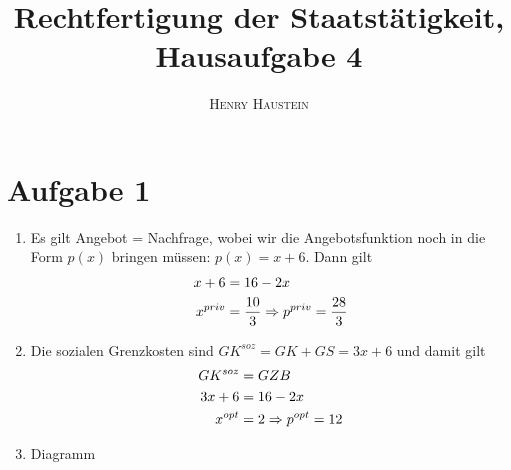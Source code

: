 \documentclass{article}
\title{\textbf{Rechtfertigung der Staatstätigkeit, Hausaufgabe 4}}
\author{\textsc{Henry Haustein}}
\date{}
\begin{document}
	\maketitle
	
	\section*{Aufgabe 1}
	\begin{enumerate}[label=(\alph*)]
		\item Es gilt Angebot = Nachfrage, wobei wir die Angebotsfunktion noch in die Form $p(x)$ bringen müssen: $p(x)=x+6$. Dann gilt
		\begin{align}
			x+6 &= 16-2x \notag \\
			x^{priv} &= \frac{10}{3} \Rightarrow p^{priv}=\frac{28}{3} \notag
		\end{align}
		\item Die sozialen Grenzkosten sind $GK^{soz}=GK + GS = 3x+6$ und damit gilt
		\begin{align}
			GK^{soz} &= GZB \notag \\
			3x+6 &= 16-2x \notag \\
			x^{opt} &= 2 \Rightarrow p^{opt}=12 \notag
		\end{align}
		\item Diagramm
		\begin{center}
\end{center}
\end{enumerate}
\end{document}
